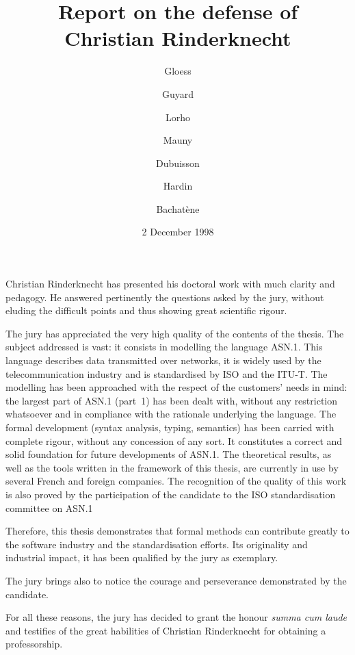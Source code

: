\documentclass[a4paper,11pt,twoside]{article}
\title{Report on the defense of\\ Christian Rinderknecht}
\author{ Gloess \and  Guyard \and  Lorho \and 
  Mauny \and  Dubuisson \and  Hardin \and 
  Bachatène}
\date{2 December 1998}
\begin{document}
\maketitle

\thispagestyle{empty}

Christian Rinderknecht has presented his doctoral work with much
clarity and pedagogy. He answered pertinently the questions asked by
the jury, without eluding the difficult points and thus showing great
scientific rigour.

The jury has appreciated the very high quality of the contents of the
thesis. The subject addressed is vast: it consists in modelling the
language ASN.1. This language describes data transmitted over
networks, it is widely used by the telecommunication industry and is
standardised by ISO and the ITU-T. The modelling has been approached
with the respect of the customers' needs in mind: the largest part of
ASN.1 (part~1) has been dealt with, without any restriction whatsoever
and in compliance with the rationale underlying the language. The
formal development (syntax analysis, typing, semantics) has been
carried with complete rigour, without any concession of any sort. It
constitutes a correct and solid foundation for future developments of
ASN.1. The theoretical results, as well as the tools written in the
framework of this thesis, are currently in use by several French and
foreign companies. The recognition of the quality of this work is also
proved by the participation of the candidate to the ISO
standardisation committee on ASN.1

Therefore, this thesis demonstrates that formal methods can contribute
greatly to the software industry and the standardisation efforts. Its
originality and industrial impact, it has been qualified by the jury
as exemplary.

The jury brings also to notice the courage and perseverance
demonstrated by the candidate.

For all these reasons, the jury has decided to grant the honour
\emph{summa cum laude} and testifies of the great habilities of
Christian Rinderknecht for obtaining a professorship.
\end{document}
